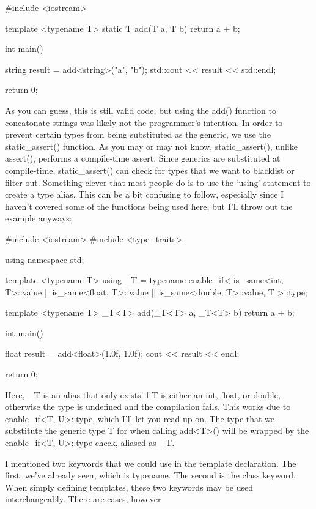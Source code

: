 \documentclass{article}
\begin{document}
\begin{cpplst}

#include <iostream>

template <typename T>
static T add(T a, T b)
{
    return a + b;
}

int main()
{
    string result = add<string>("a", "b");
    std::cout << result << std::endl;

    return 0;
}

\end{cpplst}

As you can guess, this is still valid code, but using the add() function to concatonate strings was likely
not the programmer’s intention. In order to prevent certain types from being substituted as the generic, we
use the static\_assert() function. As you may or may not know, static\_assert(), unlike assert(), performs a
compile-time assert. Since generics are substituted at compile-time, static\_assert() can check for types
that we want to blacklist or filter out. Something clever that most people do is to use the ‘using’ statement
to create a type alias. This can be a bit confusing to follow, especially since I haven’t covered some of the
functions being used here, but I’ll throw out the example anyways:

\begin{cpplst}

#include <iostream>
#include <type_traits>

using namespace std;

template <typename T>
using _T = typename enable_if<
    is_same<int, T>::value ||
    is_same<float, T>::value ||
    is_same<double, T>::value,
    T
>::type;

template <typename T>
_T<T> add(_T<T> a, _T<T> b) {
    return a + b;
}

int main()
{
    float result = add<float>(1.0f, 1.0f);
    cout << result << endl;

    return 0;
}

\end{cpplst}

Here, \_T is an alias that only exists if T is either an int, float, or double, otherwise the type is
undefined and the compilation fails. This works due to enable\_if<T, U>::type, which I’ll let you read up on.
The type that we substitute the generic type T for when calling add<T>() will be wrapped by the
enable\_if<T, U>::type check, aliased as \_T.

I mentioned two keywords that we could use in the template declaration. The first, we’ve already seen, which
is typename. The second is the class keyword. When simply defining templates, these two keywords may be used
interchangeably. There are cases, however
\end{document}
